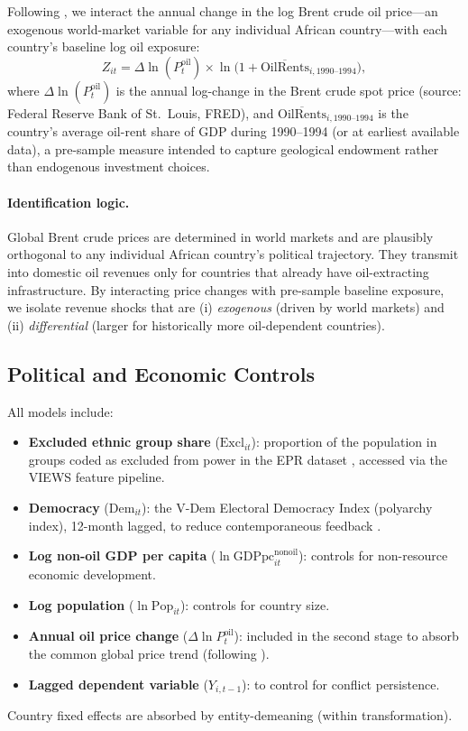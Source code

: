 \documentclass[12pt]{article}
\begin{document}
Following \citet{bruckner2010international}, we interact the annual change
in the log Brent crude oil price---an exogenous world-market variable
for any individual African country---with each country's baseline
log oil exposure:
\begin{equation}
  Z_{it} = \Delta\ln(P^{\text{oil}}_t) \times
           \ln\!\bigl(1 + \overline{\text{OilRents}}_{i,1990\text{--}1994}\bigr),
  \label{eq:iv}
\end{equation}
where $\Delta\ln(P^{\text{oil}}_t)$ is the annual log-change in the
Brent crude spot price (source: Federal Reserve Bank of St.\ Louis, FRED),
and $\overline{\text{OilRents}}_{i,1990\text{--}1994}$ is the country's
average oil-rent share of GDP during 1990--1994
(or at earliest available data),
a pre-sample measure intended to capture geological endowment
rather than endogenous investment choices.

\paragraph{Identification logic.}
Global Brent crude prices are determined in world markets
and are plausibly orthogonal to any individual African country's
political trajectory.
They transmit into domestic oil revenues only for countries that already
have oil-extracting infrastructure.
By interacting price changes with pre-sample baseline exposure,
we isolate revenue shocks that are (i) \emph{exogenous} (driven by world markets)
and (ii) \emph{differential} (larger for historically more oil-dependent countries).

\subsection{Political and Economic Controls}

All models include:
\begin{itemize}
  \item \textbf{Excluded ethnic group share} ($\text{Excl}_{it}$):
        proportion of the population in groups coded as excluded from
        power in the EPR dataset \citep{vogt2015integrating},
        accessed via the VIEWS feature pipeline.
  \item \textbf{Democracy} ($\text{Dem}_{it}$):
        the V-Dem Electoral Democracy Index (polyarchy index),
        12-month lagged, to reduce contemporaneous feedback
        \citep{coppedge2023vdem}.
  \item \textbf{Log non-oil GDP per capita} ($\ln\text{GDPpc}^{\text{nonoil}}_{it}$):
        controls for non-resource economic development.
  \item \textbf{Log population} ($\ln\text{Pop}_{it}$):
        controls for country size.
  \item \textbf{Annual oil price change} ($\Delta\ln P^{\text{oil}}_t$):
        included in the second stage to absorb the common global price trend
        (following \citealt{bruckner2010international}).
  \item \textbf{Lagged dependent variable} ($Y_{i,t-1}$):
        to control for conflict persistence.
\end{itemize}
Country fixed effects are absorbed by entity-demeaning (within transformation).
\end{document}
